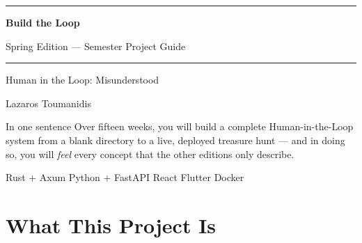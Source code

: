 \documentclass[
  11pt,
  oneside,
  DIV=12,
]{scrartcl}
\begin{document}

\thispagestyle{empty}
\begin{center}
  \vspace*{1.2cm}

  {\color{RuleGray}\rule{\linewidth}{0.4pt}}
  \vspace{0.5cm}

  {\fontsize{32}{38}\selectfont\sffamily\bfseries\color{SpringMoss}
    Build the Loop}

  \vspace{0.3cm}

  {\LARGE\sffamily\color{SpringLeaf}
    Spring Edition — Semester Project Guide}

  \vspace{0.4cm}

  {\color{RuleGray}\rule{\linewidth}{0.4pt}}

  \vspace{0.8cm}

  {\large\sffamily\color{DeliverGray}
    Human in the Loop: Misunderstood}

  \vspace{0.3cm}

  {\normalsize\sffamily\color{gray}
    Lazaros Toumanidis}

  \vspace{1.2cm}

  \begin{infobox}{In one sentence}
    Over fifteen weeks, you will build a complete Human-in-the-Loop system
    from a blank directory to a live, deployed treasure hunt — and in doing
    so, you will \emph{feel} every concept that the other editions only
    describe.
  \end{infobox}

  \vspace{0.8cm}

  {\small\sffamily\color{gray}
    \faTools\enspace Rust + Axum \quad
    \faPython\enspace Python + FastAPI \quad
    \faReact\enspace React \quad
    \faMobile*\enspace Flutter \quad
    \faDocker\enspace Docker}

\end{center}

\clearpage

\section*{What This Project Is}
\end{document}
